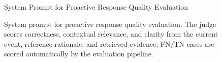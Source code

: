 \begin{figure}[!t]
\begin{promptbox}{System Prompt for Proactive Response Quality Evaluation}
\end{promptbox}
\caption{System prompt for proactive response quality evaluation. The judge scores correctness, contextual relevance, and clarity from the current event, reference rationale, and retrieved evidence; FN/TN cases are scored automatically by the evaluation pipeline.}
\label{fig:quality_prompt}
\end{figure}

